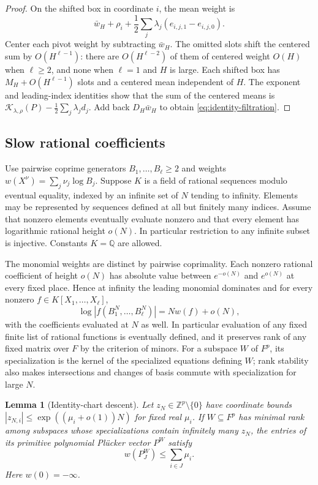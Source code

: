 \documentclass[11pt,a4paper,reqno]{amsart}
\newtheorem{lemma}[theorem]{Lemma}
\theoremstyle{definition}
\theoremstyle{remark}
\numberwithin{equation}{section}
\begin{document}
\begin{proof}
On the shifted box in coordinate \(i\), the mean weight is
\[
      \bar w_H+\rho_i+
        \frac12\sum_j\lambda_j(e_{i,j,1}-e_{i,j,0}).
\]
Center each pivot weight by subtracting \(\bar w_H\).
The omitted slots shift the centered sum by \(O(H^{\ell-1})\):
there are \(O(H^{\ell-2})\) of them of centered weight \(O(H)\)
when \(\ell\ge2\), and none when \(\ell=1\) and \(H\) is large.
Each shifted box has \(M_H+O(H^{\ell-1})\) slots and a centered
mean independent of \(H\). The exponent and leading-index
identities show that the sum of the centered means is
\(\mathcal K_{\lambda,\rho}(P)-\tfrac12\sum_j\lambda_jd_j\).
Add back \(D_H\bar w_H\) to obtain \eqref{eq:identity-filtration}.
\end{proof}

\subsection{Slow rational coefficients}

Use pairwise coprime generators \(B_1,\ldots,B_\ell\ge2\) and
weights \(w(X^\nu)=\sum_j \nu_j\log B_j\).
Suppose \(K\) is a field of rational sequences modulo eventual
equality, indexed by an infinite set of \(N\) tending to infinity.
Elements may be represented by sequences defined at all but
finitely many indices. Assume that nonzero elements eventually
evaluate nonzero and that every element has logarithmic
rational height \(o(N)\). In particular restriction to any
infinite subset is injective. Constants \(K=\mathbb Q\) are
allowed.

The monomial weights are distinct by pairwise coprimality.
Each nonzero rational coefficient of height \(o(N)\) has
absolute value between \(e^{-o(N)}\) and \(e^{o(N)}\) at every
fixed place. Hence at infinity the leading monomial dominates
and for every nonzero \(f\in K[X_1,\ldots,X_\ell]\),
\[
   \log|f(B_1^N,\ldots,B_\ell^N)|=Nw(f)+o(N),
\]
with the coefficients evaluated at \(N\) as well. In particular
evaluation of any fixed finite list of rational functions is
eventually defined, and it preserves rank of any fixed matrix
over \(F\) by the criterion of minors. For a subspace \(W\)
of \(F^p\), its specialization is the kernel of the specialized
equations defining \(W\); rank stability also makes intersections
and changes of basis commute with specialization for large \(N\).

\begin{lemma}[Identity-chart descent]\label{lem:identity}
Let \(z_N\in\mathbb Z^p\setminus\{0\}\) have coordinate bounds
\(|z_{N,i}|\le \exp((\mu_i+o(1))N)\) for fixed real \(\mu_i\).
If \(W\subseteq F^p\) has minimal rank among subspaces whose
specializations contain infinitely many \(z_N\), the entries
of its primitive polynomial Pl\"ucker vector \(P^W\) satisfy
\[
                    w(P^W_J)\le\sum_{i\in J}\mu_i.
\]
Here \(w(0)=-\infty\).
\end{lemma}
\end{document}
